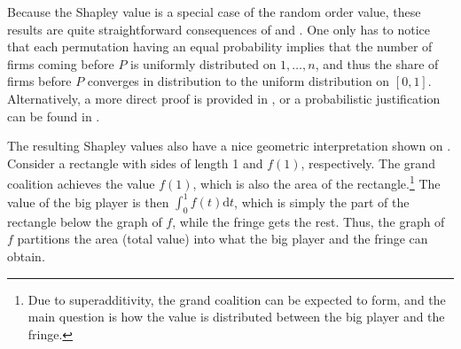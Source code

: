 \documentclass[a4paper]{article}
\newcommand{\dt}{\mathrm{d}t}
\begin{document}
Because the Shapley value is a special case of the random order value, these results are quite straightforward consequences of  and .
One only has to notice that each permutation having an equal probability implies that the number of firms coming before $P$ is uniformly distributed on $1, \dots, n$, and thus the share of firms before $P$ converges in distribution to the uniform distribution on $[0, 1]$.
Alternatively, a more direct proof is provided in , or a probabilistic justification can be found in \textcite{levy1997individual}.

The resulting Shapley values also have a nice geometric interpretation shown on .
Consider a rectangle with sides of length 1 and $f(1)$, respectively.
The grand coalition achieves the value $f(1)$, which is also the area of the rectangle.\footnote{
    Due to superadditivity, the grand coalition can be expected to form, and the main question is how the value is distributed between the big player and the fringe.
}
The value of the big player is then $\int_0^1 f(t) \dt$, which is simply the part of the rectangle below the graph of $f$, while the fringe gets the rest.
Thus, the graph of $f$ partitions the area (total value) into what the big player and the fringe can obtain.
\end{document}

